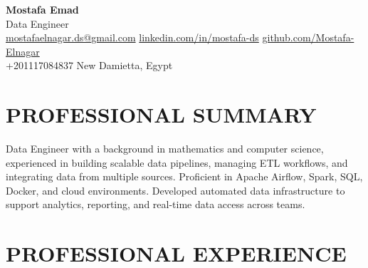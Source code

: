 \documentclass[11pt]{article}
\begin{document}
\begin{center}
\huge\textbf{Mostafa Emad}\\
\Large Data Engineer \\
\vspace{0.2em}
\normalsize
{} \href{mailto:mostafaelnagar.ds@gmail.com}{mostafaelnagar.ds@gmail.com} 
\hspace{0.5em}  \href{https://www.linkedin.com/in/mostafa-ds}{linkedin.com/in/mostafa-ds} 
\hspace{0.5em}  \href{https://github.com/Mostafa-Elnagar}{github.com/Mostafa-Elnagar} \\
\hspace{0.5em}  +201117084837 
\hspace{0.5em}  New Damietta, Egypt 

\end{center}

\section{PROFESSIONAL SUMMARY}
Data Engineer with a background in mathematics and computer science, experienced in building scalable data pipelines, managing ETL workflows, and integrating data from multiple sources. Proficient in Apache Airflow, Spark, SQL, Docker, and cloud environments. Developed automated data infrastructure to support analytics, reporting, and real-time data access across teams.
\section{PROFESSIONAL EXPERIENCE}

\end{document}
